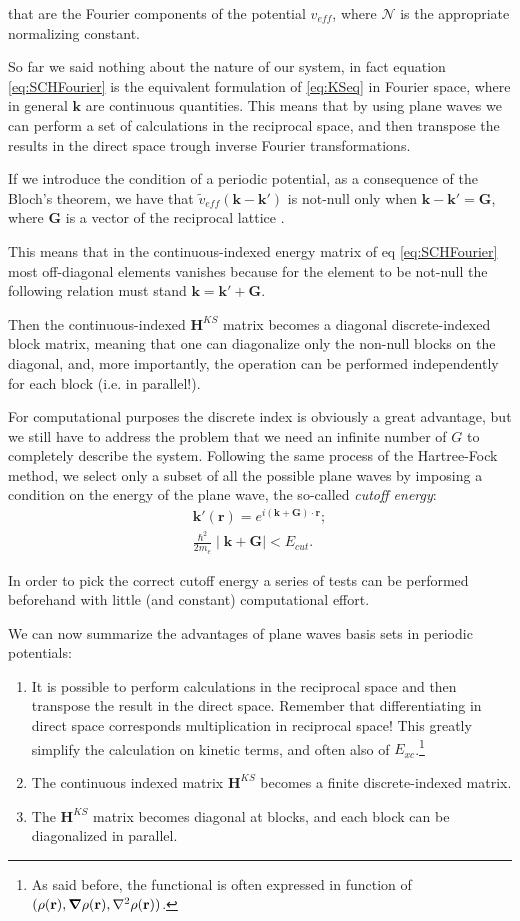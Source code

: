 \documentclass[a4paper,12pt]{article}
\newcommand\mf[1]{\mathbf{#1}}
\newcommand\dens{\rho(\mathbf{r})}
\newcommand\erre{\mathbf{r}}
\begin{document}
that are the Fourier components of the potential $v_{eff}$, where $\mathcal{N}$ is the appropriate normalizing constant.

So far we said nothing about the nature of our system, in fact equation \eqref{eq:SCHFourier} is the equivalent formulation of \eqref{eq:KSeq} in Fourier space, where in general $\mf{k}$ are continuous quantities.
This means that by using plane waves we can perform a set of calculations in the reciprocal space, and then transpose the results in the direct space trough inverse Fourier transformations.

If we introduce the condition of a periodic potential, as a consequence of the Bloch's theorem, we have that $\tilde{v}_{eff}(\mf{k} - \mf{k'})$ is not-null only when $\mf{k} - \mf{k'} = \mf{G}$, where $\mf{G}$ is a vector of the reciprocal lattice \cite{Martin}.

This means that in the continuous-indexed energy matrix of eq \eqref{eq:SCHFourier} most off-diagonal elements vanishes because for the element to be not-null the following relation must stand $\mf{k} = \mf{k'} + \mf{G}$.

Then the continuous-indexed $\mf{H}^{KS}$ matrix becomes a diagonal discrete-indexed block matrix, meaning that one can diagonalize only the non-null blocks on the diagonal, and, more importantly, the operation can be performed independently for each block (i.e. in parallel!).

For computational purposes the discrete index is obviously a great advantage, but we still have to address the problem that we need an infinite number of $G$ to completely describe the system.
Following the same process of the Hartree-Fock method, we select only a subset of all the possible plane waves by imposing a condition on the energy of the plane wave, the so-called \textit{cutoff energy}:
\begin{align}
	\mf{k'}(\erre) = e^{i(\mf{k + G}) \cdot \erre};\\
	\frac{\hbar^2}{2m_e}\mid \mf{k + G} \mid < E_{cut}. \label{eq:cutoffEnergy}
\end{align}

In order to pick the correct cutoff energy a series of tests can be performed beforehand with little (and constant) computational effort.

We can now summarize the advantages of plane waves basis sets in periodic potentials:
\begin{enumerate}
	\item It is possible to perform calculations in the reciprocal space and then transpose the result in the direct space. Remember that differentiating in direct space corresponds multiplication in reciprocal space! This greatly simplify the calculation on kinetic terms, and often also of $E_{xc}$.\footnote{As said before, the functional is often expressed in function of $(\dens,\grad\dens,\nabla^2\dens)$.}
	\item The continuous indexed matrix $\mf{H}^{KS}$ becomes a finite discrete-indexed matrix.
	\item The $\mf{H}^{KS}$ matrix becomes diagonal at blocks, and each block can be diagonalized in parallel. \label{en:Kpoints}
\end{enumerate}
\end{document}
